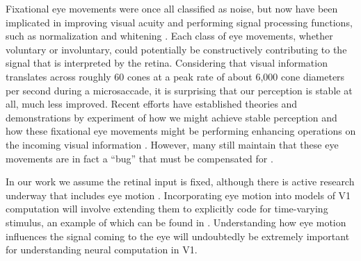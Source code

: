 Fixational eye movements were once all classified as noise, but now have been implicated in improving visual acuity \parencite{ratnam2017benefits, rucci2007miniature} and performing signal processing functions, such as normalization and whitening \parencite{aytekin2014visual}.
Each class of eye movements, whether voluntary or involuntary, could potentially be constructively contributing to the signal that is interpreted by the retina.
Considering that visual information translates across roughly 60 cones at a peak rate of about 6,000 cone diameters per second during a microsaccade, it is surprising that our perception is stable at all, much less improved.
Recent efforts have established theories and demonstrations by experiment of how we might achieve stable perception \parencite{arathorn2013unstable, bridgeman2010brain, murakami1998jitter, burak2010bayesian} and how these fixational eye movements might be performing enhancing operations on the incoming visual information \parencite{ahissar2012seeing, mostofi2016visual, kenyon2004correlated}.
However, many still maintain that these eye movements are in fact a ``bug'' that must be compensated for \parencite{packer1992blurring, kowler1979miniature, engbert2011integrated}.

In our work we assume the retinal input is fixed, although there is active research underway that includes eye motion \parencite{ratnam2017benefits, anderson2019high}. Incorporating eye motion into models of V1 computation will involve extending them to explicitly code for time-varying stimulus, an example of which can be found in \parencite{olshausen2003learning}. Understanding how eye motion influences the signal coming to the eye will undoubtedly be extremely important for understanding neural computation in V1. 


